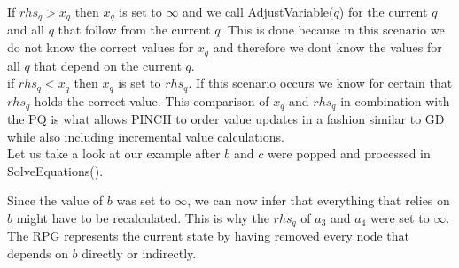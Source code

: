
If $rhs_q > x_q$ then $x_q$ is set to $\infty$ and we call AdjustVariable($q$) for the current $q$ and all $q$ that follow from the current $q$. This is done because in this scenario we do not know the correct values for $x_q$ and therefore we dont know the values for all $q$ that depend on the current $q$.\\

if $rhs_q < x_q$ then $x_q$ is set to $rhs_q$. If this scenario occurs we know for certain that $rhs_q$ holds the correct value. This comparison of $x_q$ and $rhs_q$ in combination with the PQ is what allows PINCH to order value updates in a fashion similar to GD while also including incremental value calculations.\\

Let us take a look at our example after $b$ and $c$ were popped and processed in SolveEquations().

\newpage
\begin{center}
\end{center}

Since the value of $b$ was set to $\infty$, we can now infer that everything that relies on $b$ might have to be recalculated. This is why the $rhs_q$ of $a_3$ and $a_4$ were set to $\infty$. The RPG represents the current state by having removed every node that depends on $b$ directly or indirectly.\\

